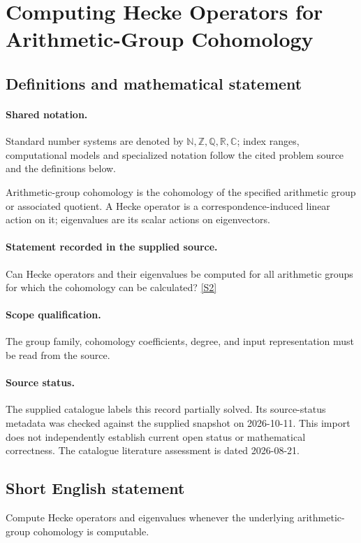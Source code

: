 \documentclass[11pt]{article}
\newcommand{\sref}[2]{\hyperlink{source:#1:#2}{[S#2]}}
\begin{document}
\section{Computing Hecke Operators for Arithmetic-Group Cohomology}\label{statement}

\subsection{Definitions and mathematical statement}

\paragraph{Shared notation.}Standard number systems are denoted by $\mathbb N,\mathbb Z,\mathbb Q,\mathbb R,\mathbb C$; index ranges, computational models and specialized notation follow the cited problem source and the definitions below.


Arithmetic-group cohomology is the cohomology of the specified arithmetic group or associated quotient. A Hecke operator is a correspondence-induced linear action on it; eigenvalues are its scalar actions on eigenvectors.
\paragraph{Statement recorded in the supplied source.}
Can Hecke operators and their eigenvalues be computed for all arithmetic groups for which the cohomology can be calculated? \sref{statement}{2}
\paragraph{Scope qualification.}
The group family, cohomology coefficients, degree, and input representation must be read from the source.
\paragraph{Source status.}
The supplied catalogue labels this record partially solved. Its source-status metadata was checked against the supplied snapshot on 2026-10-11. This import does not independently establish current open status or mathematical correctness. The catalogue literature assessment is dated 2026-08-21.
\subsection{Short English statement}
Compute Hecke operators and eigenvalues whenever the underlying arithmetic-group cohomology is computable.
\end{document}
